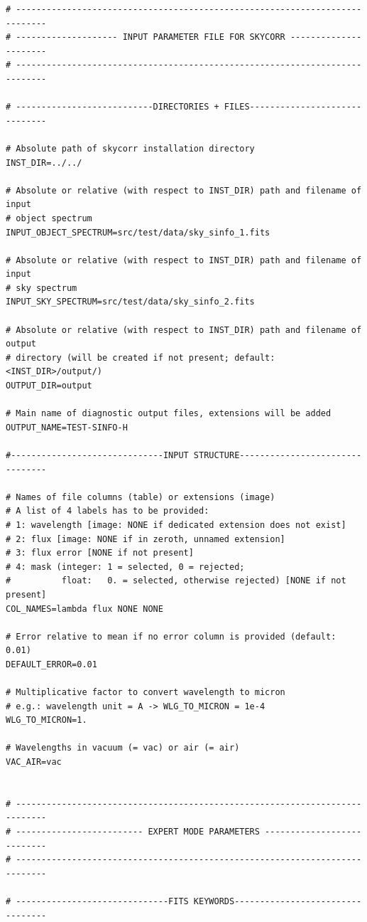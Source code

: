 {\small
\begin{verbatim}
# ----------------------------------------------------------------------------
# -------------------- INPUT PARAMETER FILE FOR SKYCORR ----------------------
# ----------------------------------------------------------------------------

# ---------------------------DIRECTORIES + FILES------------------------------

# Absolute path of skycorr installation directory
INST_DIR=../../

# Absolute or relative (with respect to INST_DIR) path and filename of input
# object spectrum
INPUT_OBJECT_SPECTRUM=src/test/data/sky_sinfo_1.fits

# Absolute or relative (with respect to INST_DIR) path and filename of input
# sky spectrum
INPUT_SKY_SPECTRUM=src/test/data/sky_sinfo_2.fits

# Absolute or relative (with respect to INST_DIR) path and filename of output
# directory (will be created if not present; default: <INST_DIR>/output/)
OUTPUT_DIR=output

# Main name of diagnostic output files, extensions will be added
OUTPUT_NAME=TEST-SINFO-H

#------------------------------INPUT STRUCTURE--------------------------------

# Names of file columns (table) or extensions (image)
# A list of 4 labels has to be provided:
# 1: wavelength [image: NONE if dedicated extension does not exist]
# 2: flux [image: NONE if in zeroth, unnamed extension]
# 3: flux error [NONE if not present]
# 4: mask (integer: 1 = selected, 0 = rejected;
#          float:   0. = selected, otherwise rejected) [NONE if not present]
COL_NAMES=lambda flux NONE NONE

# Error relative to mean if no error column is provided (default: 0.01)
DEFAULT_ERROR=0.01

# Multiplicative factor to convert wavelength to micron
# e.g.: wavelength unit = A -> WLG_TO_MICRON = 1e-4
WLG_TO_MICRON=1.

# Wavelengths in vacuum (= vac) or air (= air)
VAC_AIR=vac


# ----------------------------------------------------------------------------
# ------------------------- EXPERT MODE PARAMETERS ---------------------------
# ----------------------------------------------------------------------------

# ------------------------------FITS KEYWORDS---------------------------------


\end{verbatim}}
